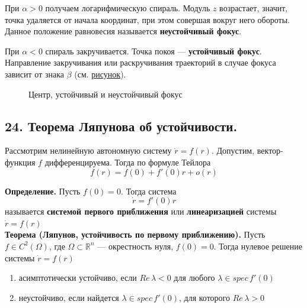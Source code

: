 При $\alpha > 0$ получаем логарифмическую спираль. Модуль $z$ возрастает, значит, точка удаляется от начала координат, при этом совершая вокруг него обороты. Данное положение равновесия называется \textbf{неустойчивый фокус}.

При $\alpha < 0$ спираль закручивается. Точка покоя --- \textbf{устойчивый фокус}. Направление закручивания или раскручивания траекторий в случае фокуса зависит от знака $\beta$ (см. \hyperref[focus]{рисунок}).

\begin{figure}[H]\label{focus}
    \caption{Центр, устойчивый и неустойчивый фокус}
\end{figure}

\subsection*{24. Теорема Ляпунова об устойчивости.}

Рассмотрим нелинейную автономную систему $\dot{r} = f(r)$. Допустим, вектор-функция $f$ дифференцируема. Тогда по формуле Тейлора
\begin{equation*}
    f(r) = f(0) + f'(0)r + o(r)
\end{equation*}

\noindent \textbf{Определение.} Пусть $f(0) = 0$. Тогда система
\begin{equation*}
    \dot{r} = f'(0)r
\end{equation*}
называется \textbf{системой первого приближения} или \textbf{линеаризацией} системы $\dot{r} = f(r)$\\

\noindent \textbf{Теорема (Ляпунов, устойчивость по первому приближению).} Пусть $f \in C^2(\Omega)$, где $\Omega \subset \mathbb{R}^n$ --- окрестность нуля, $f(0) = 0$. Тогда нулевое решение системы $\dot{r} = f(r)$
\begin{enumerate}
    \item асимптотически устойчиво, если $Re\, \lambda < 0$ для любого $\lambda \in spec\, f'(0)$
    \item неустойчиво, если найдется $\lambda \in spec\, f'(0)$, для которого $Re\, \lambda > 0$
\end{enumerate}

